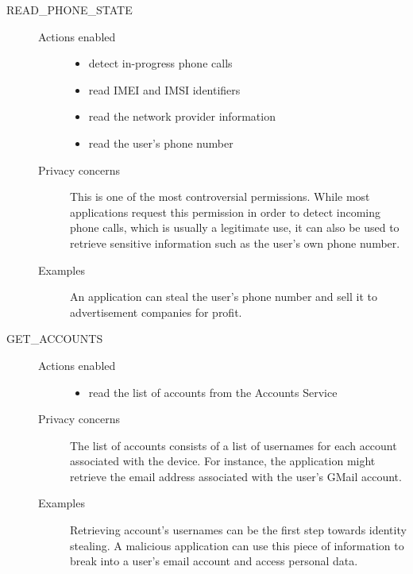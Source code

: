 \begin{description}
    \item[READ\_PHONE\_STATE] \hfill
        \begin{description}
             \item[Actions enabled] \hfill
                \begin{itemize}
                    \item detect in-progress phone calls
                    \item read IMEI and IMSI identifiers
                    \item read the network provider information
                    \item read the user's phone number
                 \end{itemize} 
             \item[Privacy concerns]
                This is one of the most controversial permissions. While most applications request this permission in order to detect incoming phone calls, which is usually a legitimate use, it can also be used to retrieve sensitive information such as the user's own phone number.
             \item[Examples]
                An application can steal the user's phone number and sell it to advertisement companies for profit.

         \end{description} 

    \item[GET\_ACCOUNTS] \hfill
        \begin{description}
             \item[Actions enabled] \hfill
                \begin{itemize}
                    \item read the list of accounts from the Accounts Service
                 \end{itemize} 
             \item[Privacy concerns]
                The list of accounts consists of a list of usernames for each account associated with the device. For instance, the application might retrieve the email address associated with the user's GMail account.
             \item[Examples]
                Retrieving account's usernames can be the first step towards identity stealing. A malicious application can use this piece of information to break into a user's email account and access personal data.
         \end{description} 


\end{description}
